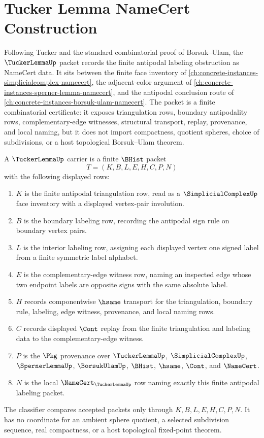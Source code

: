 \chapter{Tucker Lemma NameCert Construction}
\label{ch:concrete-instances-tucker-lemma-namecert}

Following Tucker and the standard combinatorial proof of Borsuk--Ulam, the $\TuckerLemmaUp$ packet records the finite antipodal labeling obstruction as NameCert data. It sits between the finite face inventory of \autoref{ch:concrete-instances-simplicialcomplex-namecert}, the adjacent-color argument of \autoref{ch:concrete-instances-sperner-lemma-namecert}, and the antipodal conclusion route of \autoref{ch:concrete-instances-borsuk-ulam-namecert}. The packet is a finite combinatorial certificate: it exposes triangulation rows, boundary antipodality rows, complementary-edge witnesses, structural transport, replay, provenance, and local naming, but it does not import compactness, quotient spheres, choice of subdivisions, or a host topological Borsuk--Ulam theorem.

\begin{definition}
\label{def:tucker-lemma-carrier}
A $\TuckerLemmaUp$ carrier is a finite $\BHist$ packet
$$
T=(K,B,L,E,H,C,P,N)
$$
with the following displayed rows:
\begin{enumerate}
\item $K$ is the finite antipodal triangulation row, read as a $\SimplicialComplexUp$ face inventory with a displayed vertex-pair involution.
\item $B$ is the boundary labeling row, recording the antipodal sign rule on boundary vertex pairs.
\item $L$ is the interior labeling row, assigning each displayed vertex one signed label from a finite symmetric label alphabet.
\item $E$ is the complementary-edge witness row, naming an inspected edge whose two endpoint labels are opposite signs with the same absolute label.
\item $H$ records componentwise $\hsame$ transport for the triangulation, boundary rule, labeling, edge witness, provenance, and local naming rows.
\item $C$ records displayed $\Cont$ replay from the finite triangulation and labeling data to the complementary-edge witness.
\item $P$ is the $\Pkg$ provenance over $\TuckerLemmaUp$, $\SimplicialComplexUp$, $\SpernerLemmaUp$, $\BorsukUlamUp$, $\BHist$, $\hsame$, $\Cont$, and $\NameCert$.
\item $N$ is the local $\NameCert_{\TuckerLemmaUp}$ row naming exactly this finite antipodal labeling packet.
\end{enumerate}
The classifier compares accepted packets only through $K,B,L,E,H,C,P,N$. It has no coordinate for an ambient sphere quotient, a selected subdivision sequence, real compactness, or a host topological fixed-point theorem.
\end{definition}


